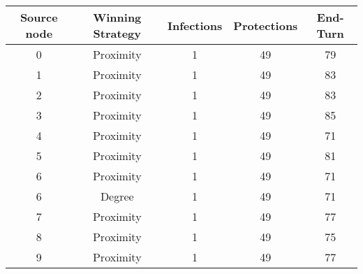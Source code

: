 \documentclass[results.tex]{subfiles}
\begin{document}
    \begin{center}
        \begin{tabular}{| c || c | c | c | c |}
            \hline
            {\bfseries Source node} & {\bfseries Winning Strategy} & {\bfseries Infections} & {\bfseries Protections}
            & {\bfseries End-Turn}
            \\  %
            \hline\hline
            0                       & Proximity                    & 1                      & 49                      & 79                   \\
            \hline
            1                       & Proximity                    & 1                      & 49                      & 83                   \\
            \hline
            2                       & Proximity                    & 1                      & 49                      & 83                   \\
            \hline
            3                       & Proximity                    & 1                      & 49                      & 85                   \\
            \hline
            4                       & Proximity                    & 1                      & 49                      & 71                   \\
            \hline
            5                       & Proximity                    & 1                      & 49                      & 81                   \\
            \hline
            6                       & Proximity                    & 1                      & 49                      & 71                   \\
            \hline
            6                       & Degree                       & 1                      & 49                      & 71                   \\
            \hline
            7                       & Proximity                    & 1                      & 49                      & 77                   \\
            \hline
            8                       & Proximity                    & 1                      & 49                      & 75                   \\
            \hline
            9                       & Proximity                    & 1                      & 49                      & 77                   \\

\end{tabular}
\end{center}
\end{document}

